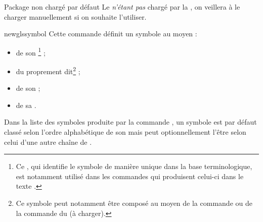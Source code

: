 \begin{dbwarning}{Package  non chargé par défaut}{}
  Le  \emph{n'étant pas} chargé par la \yatCl, on veillera
  à le charger manuellement si on souhaite l'utiliser.
\end{dbwarning}


\begin{docCommand}{newglssymbol}{}
  Cette commande définit un symbole au moyen :
  \begin{itemize}
  \item de son \footnote{Ce , qui identifie le symbole de
      manière unique dans la base terminologique, est notamment utilisé dans
      les commandes qui produisent celui-ci dans le texte .} ;
\item du  proprement dit\footnote{Ce symbole peut notamment être
    composé au moyen de la commande  ou de la commande 
    du  (à charger).} ;
  \item de son  ;
  \item de sa .
  \end{itemize}
  Dans la liste des symboles produite par la commande , un
  symbole est par défaut classé selon l'ordre alphabétique de son 
  mais peut optionnellement l'être selon celui d'une autre chaîne de
  .
\end{docCommand}


